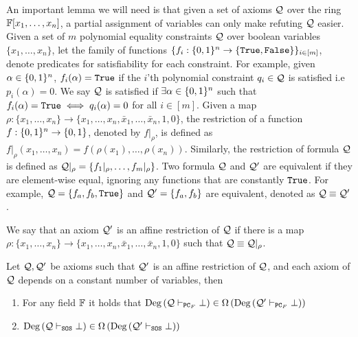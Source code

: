 \documentclass[11pt]{article}
\begin{document}
An important lemma we will need is that given a set of axioms $\mathcal{Q}$ over the ring $\mathbb{F}[x_1, \dots, x_n]$, a partial assignment of variables can only make refuting $\mathcal{Q}$ easier.
Given a set of $m$ polynomial equality constraints $\mathcal{Q}$ over boolean variables $\{x_1, \dots, x_n\}$, let the family of functions $\{f_i: \{0,1\}^n \rightarrow \{\texttt{True},\texttt{False}\} \}_{i \in [m]}$, denote predicates for satisfiability for each constraint.
For example, given $\alpha \in \{0,1\}^n$, $f_i(\alpha) = \texttt{True}$ if the $i$'th polynomial constraint $q_i \in \mathcal{Q}$ is satisfied i.e $p_i(\alpha) = 0$.
We say $\mathcal{Q}$ is satisfied if $\exists \alpha \in \{0,1\}^n$ such that $f_i(\alpha) = \texttt{True} \iff q_i(\alpha)=0$ for all $i \in [m]$.
Given a map $\rho: \{x_1, \dots, x_n \} \rightarrow \{x_1, \dots, x_n, \bar{x}_1, \dots, \bar{x}_n, 1, 0 \}$, the restriction of a function $f: \{0,1\}^n \rightarrow \{0,1\}$, denoted by $f|_\rho$, is defined as $f|_\rho(x_1, \dots, x_n) = f(\rho(x_1), \dots, \rho(x_n))$.
Similarly, the restriction of formula $\mathcal{Q}$ is defined as $\mathcal{Q}|_\rho = \{f_{1}|_\rho, \dots, f_{m}|_\rho \}$.
Two formula $\mathcal{Q}$ and $\mathcal{Q}'$ are equivalent if they are element-wise equal, ignoring any functions that are constantly $\texttt{True}$.
For example, $\mathcal{Q} = \{f_a, f_b, \texttt{True} \}$ and $\mathcal{Q}' = \{f_a, f_b\}$ are equivalent, denoted as $\mathcal{Q} \equiv \mathcal{Q}'$.


\begin{definition}\label{def:affine-restriction}
We say that an axiom $\mathcal{Q}'$ is an
affine restriction of $\mathcal{Q}$ if there is a map $\rho : \{x_1,\dots,x_n\} \rightarrow \{x_1, \dots, x_n, \bar{x}_1, \dots, \bar{x}_n, 1, 0 \}$ such that $\mathcal{Q} \equiv \mathcal{Q}|_{\rho}$.
\end{definition}


\begin{lemma}\label{lemma:affine_restriction}
Let $\mathcal{Q}, \mathcal{Q}'$ be axioms such that $\mathcal{Q}'$ is an affine restriction of $\mathcal{Q}$, and each axiom
of $\mathcal{Q}$ depends on a constant number of variables, then
\begin{enumerate}
	\item For any field $\mathbb{F}$ it holds that $\text{Deg}\left(\mathcal{Q} \vdash_{\texttt{PC}_F} \bot\right) \in \Omega\left(\text{Deg}\left(\mathcal{Q}' \vdash_{\texttt{PC}_F} \bot\right)\right)$
	\item $\text{Deg}\left(\mathcal{Q} \vdash_{\texttt{SOS}} \bot\right) \in \Omega\left(\text{Deg}\left(\mathcal{Q}' \vdash_{\texttt{SOS}} \bot\right)\right)$
\end{enumerate}
\end{lemma}
\end{document}
